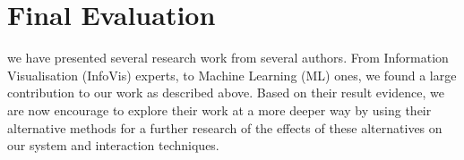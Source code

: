 \section{Final Evaluation}

we have presented several research work from several authors. From Information Visualisation (InfoVis) experts, to Machine Learning (ML) ones, we found a large contribution to our work as described above. Based on their result evidence, we are now encourage to explore their work at a more deeper way by using their alternative methods for a further research of the effects of these alternatives on our system and interaction techniques.
